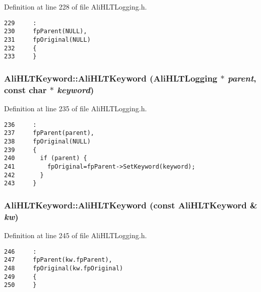 Definition at line 228 of file Ali\-HLTLogging.h.

\footnotesize\begin{verbatim}229     :
230     fpParent(NULL),
231     fpOriginal(NULL)
232     {
233     }

\end{verbatim}\normalsize 


\subsubsection{\setlength{\rightskip}{0pt plus 5cm}Ali\-HLTKeyword::Ali\-HLTKeyword ({\bf Ali\-HLTLogging} $\ast$ {\em parent}, const char $\ast$ {\em keyword})\hspace{0.3cm}{\tt  [inline]}}\label{classAliHLTKeyword_a1}




Definition at line 235 of file Ali\-HLTLogging.h.

\footnotesize\begin{verbatim}236     :
237     fpParent(parent),
238     fpOriginal(NULL)
239     {
240       if (parent) {
241         fpOriginal=fpParent->SetKeyword(keyword);
242       }
243     }

\end{verbatim}\normalsize 


\subsubsection{\setlength{\rightskip}{0pt plus 5cm}Ali\-HLTKeyword::Ali\-HLTKeyword (const {\bf Ali\-HLTKeyword} \& {\em kw})\hspace{0.3cm}{\tt  [inline]}}\label{classAliHLTKeyword_a2}




Definition at line 245 of file Ali\-HLTLogging.h.

\footnotesize\begin{verbatim}246     :
247     fpParent(kw.fpParent),
248     fpOriginal(kw.fpOriginal)
249     {
250     }

\end{verbatim}\normalsize 


